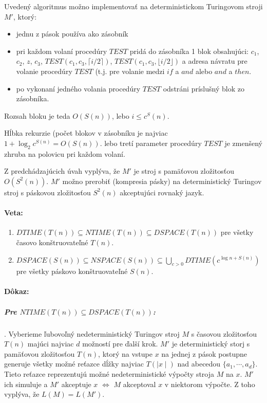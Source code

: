\documentclass{article}
\begin{document}
\par Uvedený algoritmus možno implementovať na deterministickom Turingovom
stroji $M'$, ktorý:
\begin{itemize}
	\item jednu z pások používa ako zásobník
	\item pri každom volaní procedúry $TEST$ pridá do zásobníka 1 blok
		obsahujúci: $c_1$, $c_2$, $z$, $c_3$, $TEST(c_1, c_3, \lceil i/2
		\rceil)$, $TEST(c_1, c_3, \lfloor i/2 \rfloor)$ a adresa návratu
		pre volanie procedúry $TEST$ (t.j. pre volanie medzi $if$ a
		$and$ alebo $and$ a $then$.
	\item po vykonaní jedného volania procedúry $TEST$ odstráni príslušný
		blok zo zásobníka.
\end{itemize}
Rozsah bloku je teda $O(S(n))$, lebo $i \leq c^S(n)$.
\par Hĺbka rekurzie (počet blokov v zásobníku je najviac $1+\log_2 c^{S(n)} =
O(S(n))$. lebo tretí parameter procedúry $TEST$ je zmenšený zhruba na polovicu
pri každom volaní.

\par Z predchádzajúcich úvah vyplýva, že $M'$ je stroj s pamäťovou zložitosťou
$O(S^2(n))$. $M'$ možno prerobiť (kompresia pásky) na deterministický Turingov
stroj s páskovou zložitosťou $S^2(n)$ akceptujúci rovnaký jazyk.

\paragraph{Veta:}
\begin{enumerate}
	\item \label{itm:2a} $DTIME(T(n)) \subseteq NTIME(T(n)) \subseteq
		DSPACE(T(n))$ pre všetky časovo konštruovateľné $T(n)$.
	\item $DSPACE(S(n)) \subseteq NSPACE(S(n)) \subseteq \bigcup_{c>0}
		DTIME(c^{\log n + S(n)})$ pre všetky páskovo konštruovateľné
		$S(n)$.
\end{enumerate}

\paragraph{Dôkaz:}

\subparagraph {Pre $NTIME(T(n)) \subseteq DSPACE(T(n))$:}. Vyberieme ľubovoľný nedeterministický
Turingov stroj $M$ s časovou zložitosťou $T(n)$ majúci najviac $d$ možností pre
ďalší krok. $M'$ je deterministický storj s pamäťovou zložitosťou $T(n)$, ktorý
na vstupe $x$ na jednej z pások postupne generuje všetky možné reťazce dĺžky
najviac $T(\mid x \mid)$ nad abecedou $\{ a_1, \cdots, a_d \}$. Tieto reťazce
reprezentujú možné nedeterministické výpočty stroja $M$ na $x$. $M'$ ich
simuluje a $M'$ akceptuje $x$ $\iff$ $M$ akceptoval $x$ v niektorom výpočte. Z
toho vyplýva, že $L(M) = L(M')$. 
\end{document}
